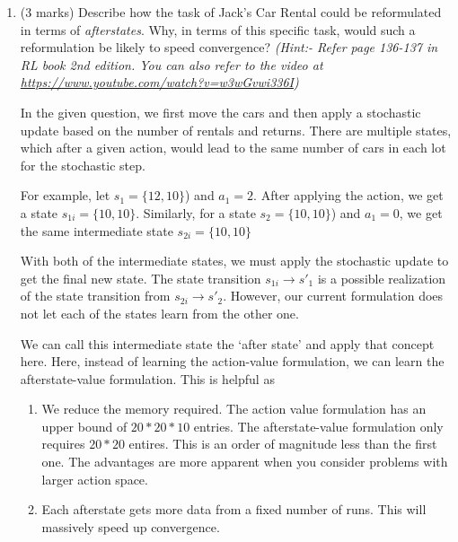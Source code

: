 \documentclass[addpoints,12pt,solution]{exam}
\begin{document}
\begin{questions}
\begin{enumerate}[label=(\alph*)]
            \item (3 marks) Describe how the task of Jack’s Car Rental could be reformulated in terms of \textit{afterstates}. Why, in terms of this specific task, would such a reformulation be likely to speed convergence? \textit{(Hint:- Refer page 136-137 in RL book 2nd edition. You can also refer to the video at \href{https://www.youtube.com/watch?v=w3wGvwi336I}{https://www.youtube.com/watch?v=w3wGvwi336I})}

            \begin{solution}
                In the given question, we first move the cars and then apply a stochastic update based on the number of rentals and returns.
                There are multiple states, which after a given action, would lead to the same number of cars in each lot for the stochastic step.

                For example, let $s_1 = \{12, 10\}$) and $a_1 = 2$.
                After applying the action, we get a state $s_{1i} = \{10, 10 \}$.
                Similarly, for a state  $s_2 = \{10, 10\}$) and $a_1 = 0$, we get the same intermediate state $s_{2i} = \{10, 10 \}$

                With both of the intermediate states, we must apply the stochastic update to get the final new state.
                The state transition $s_{1i} \rightarrow s'_{1}$ is a possible realization of the state transition
                from  $s_{2i} \rightarrow s'_{2}$.
                However, our current formulation does not let each of the states learn from the other one.

                We can call this intermediate state the `after state' and apply that concept here.
                Here, instead of learning the action-value formulation, we can learn the afterstate-value formulation.
                This is helpful as
                \begin{enumerate}
                    \item We reduce the memory required.
                    The action value formulation has an upper bound of $20 * 20 * 10$ entries.
                    The afterstate-value formulation only requires $20 * 20$ entires.
                    This is an order of magnitude less than the first one.
                    The advantages are more apparent when you consider problems with larger action space.
                    \item Each afterstate gets more data from a fixed number of runs.
                    This will massively speed up convergence.
                \end{enumerate}



\end{solution}
\end{enumerate}
\end{questions}
\end{document}
